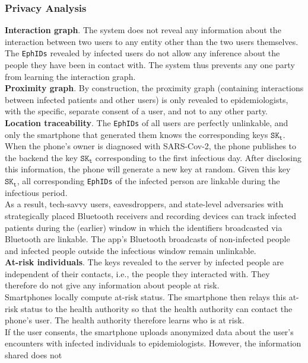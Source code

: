 \documentclass[12pt,a4paper]{article}
\begin{document}
\subsubsection*{Privacy Analysis}
\textbf{Interaction graph}. The system does not reveal any information about the interaction between two users to any entity other than the two users themselves. The \texttt{EphIDs} revealed by infected users do not allow any inference about the people they have been in contact with. The system thus prevents any one party from learning the interaction graph.\\[0.3cm]
\textbf{Proximity graph}. By construction, the proximity graph (containing interactions between infected patients and other users) is only revealed to epidemiologists, with the specific, separate consent of a user, and not to any other party.\\[0.3cm]
\textbf{Location traceability}. The \texttt{EphIDs} of all users are perfectly unlinkable, and only the smartphone that generated them knows the corresponding keys $\texttt{SK}_\texttt{t}$. When the phone’s owner is diagnosed with SARS-Cov-2, the phone publishes to the backend the key $\texttt{SK}_\texttt{t}$ corresponding to the first infectious day. After disclosing this information, the phone will generate a new key at random. Given this key $\texttt{SK}_\texttt{t}$, all corresponding \texttt{EphIDs} of the infected person are linkable during the infectious period.\\[0.3cm]
As a result, tech-savvy users, eavesdroppers, and state-level adversaries with strategically placed Bluetooth receivers and recording devices can track infected patients during the (earlier) window in which the identifiers broadcasted via Bluetooth are linkable. The app’s Bluetooth broadcasts of non-infected people and infected people outside the infectious window remain unlinkable.\\[0.3cm]
\textbf{At-risk individuals}. The keys revealed to the server by infected people are independent of their contacts, i.e., the people they interacted with. They therefore do not give any information about people at risk.\\[0.3cm]
Smartphones locally compute at-risk status. The smartphone then relays this at-risk status to the health authority so that the health authority can contact the phone’s user. The health authority therefore learns who is at risk.\\[0.3cm]
If the user consents, the smartphone uploads anonymized data about the user’s encounters
with infected individuals to epidemiologists. However, the information shared does not
\end{document}
